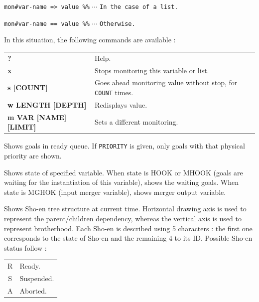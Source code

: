 \begin{itemize}
\hspace{10ex}
\verb|mon#var-name => value %%|\hspace{4ex} $\cdots$
					\verb|In the case of a list.|

\hspace{10ex}
\verb|mon#var-name == value %%|\hspace{4ex} $\cdots$ \verb|Otherwise.|

In this situation, the following commands are available :
\vspace{1ex}\\
\hspace*{15mm}\begin{tabular}{l@{ :: }l}
{\bf ?}                     & Help.\\
{\bf x}                     & Stops monitoring this variable or list.\\
{\bf s  [COUNT]}            & Goes ahead monitoring value without stop, 
					for \verb|COUNT| times.\\
{\bf w  LENGTH [DEPTH]}     & Redisplays value.\\
{\bf m  VAR [NAME] [LIMIT]} & Sets a different monitoring.\\
\end{tabular}
\vspace{1ex}

Shows goals in ready queue. If \verb|PRIORITY| is given, only goals with that
 physical priority are shown.

Shows state of specified variable. When state is HOOK or MHOOK (goals are
waiting for the instantiation of this variable), shows the waiting goals. When
state is MGHOK (input merger variable), shows merger output variable.

Shows Sho-en tree structure at current time. Horizontal drawing axis is used
to represent the parent/children dependency, whereas the vertical axis is
used to represent brotherhood. Each Sho-en is described using 5 characters :
the first one corresponds to the state of Sho-en and the remaining 4 to its
ID. Possible Sho-en status follow :
\vspace{1ex}\\
\hspace*{15mm}\begin{tabular}{c@{ :: }l}
R & Ready.\\
S & Suspended.\\
A & Aborted.\\
\end{tabular}
\vspace{1ex}


\end{itemize}
